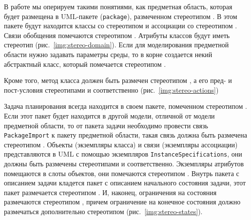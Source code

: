 В работе мы оперируем такими понятиями, как предметная область, которая будет размещена в UML-пакете (\texttt{package}), размеченном стереотипом  . В этом пакете будут находится классы со стереотипом  и ассоциации со стереотипом . Связи обобщения помечаются стереотипом . Атрибуты классов будут иметь стереотип  (рис.~\ref{img:stereo-domain}). Если для моделирования предметной области нужно задавать параметры среды, то в корне создается некий абстрактный класс, который помечается стереотипом .


\iffalse
\begin{figure}[h]
    \centering
    \begin{minipage}{0.75\linewidth}
        \centering
        \texttt{[image: stereo-domain-example]}
        \caption{Диаграмма классов, размеченных стереотипами, для описания предметной области}
        \label{img:stereo-domain-example}
    \end{minipage}
\end{figure} 

\begin{figure}[h]
    \centering
    \begin{minipage}{0.75\linewidth}
        \centering
        \texttt{[image: stereo-problem-example]}
        \caption{Диаграмма классов, размеченных стереотипами, для описания задач и состояний}
        \label{img:stereo-problem-example}
    \end{minipage}
\end{figure} 
\fi

Кроме того, метод класса должен быть размечен стереотипом , а его пред- и пост-условия стереотипами  и  соответственно (рис.~\ref{img:stereo-actions})

Задача планирования всегда находится в своем пакете, помеченном стереотипом . Если этот пакет будет находится в другой модели, отличной от модели предметной области, то от пакета задачи необходимо провести связь \texttt{PackageImport} к пакету предметной области, такая связь должна быть размечена стереотипом . Объекты (экземпляры класса) и связи (экземпляры ассоциации) представляются в UML с помощью экземпляров \texttt{InstanceSpecifications}, они должны быть размечены стереотипами  и  соответственно. Экземпляры атрибутов помещаются в слоты объектов, они помечаются стереотипом . Внутрь пакета с описанием задачи кладется пакет с описанием начального состояния задачи, этот пакет размечается стереотипом . И, наконец, ограничения на состояния размечаются стереотипом , причем ограничение на конечное состояния должно размечаться дополнительно стереотипом  (рис.~\ref{img:stereo-states}).

